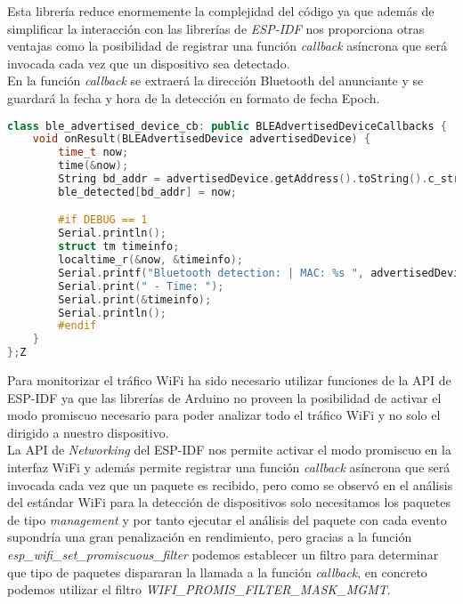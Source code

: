 \documentclass[../proyecto.tex]{subfiles}
\begin{document}
Esta librería reduce enormemente la complejidad del código ya que además de simplificar la interacción con las librerías de \textit{ESP-IDF} nos proporciona otras ventajas como la posibilidad de registrar una función \textit{callback} asíncrona que será invocada cada vez que un dispositivo sea detectado.\\

En la función \textit{callback} se extraerá la dirección Bluetooth del anunciante y se guardará la fecha y hora de la detección en formato de fecha Epoch.\\

\begin{minipage}{\linewidth}
\begin{lstlisting}[language=C++, caption=Función \textit{callback} para el escaneo BLE, captionpos=b, frame=single]
class ble_advertised_device_cb: public BLEAdvertisedDeviceCallbacks {
    void onResult(BLEAdvertisedDevice advertisedDevice) {
        time_t now;
        time(&now);
        String bd_addr = advertisedDevice.getAddress().toString().c_str();
        ble_detected[bd_addr] = now;

        #if DEBUG == 1
        Serial.println();
        struct tm timeinfo;
        localtime_r(&now, &timeinfo);
        Serial.printf("Bluetooth detection: | MAC: %s ", advertisedDevice.getAddress().toString().c_str());
        Serial.print(" - Time: ");
        Serial.print(&timeinfo);
        Serial.println();
        #endif
    }
};Z
\end{lstlisting}
\end{minipage}

Para monitorizar el tráfico WiFi ha sido necesario utilizar funciones de la API de ESP-IDF ya que las librerías de Arduino no proveen la posibilidad de activar el modo promiscuo necesario para poder analizar todo el tráfico WiFi y no solo el dirigido a nuestro dispositivo.\\

La API de \textit{Networking} del ESP-IDF nos permite activar el modo promiscuo en la interfaz WiFi y además permite registrar una función \textit{callback} asíncrona que será invocada cada vez que un paquete es recibido, pero como se observó en el análisis del estándar WiFi para la detección de dispositivos solo necesitamos los paquetes de tipo \textit{management} y por tanto ejecutar el análisis del paquete con cada evento supondría una gran penalización en rendimiento, pero gracias a la función \textit{esp\_wifi\_set\_promiscuous\_filter} podemos establecer un filtro para determinar que tipo de paquetes dispararan la llamada a la función \textit{callback}, en concreto podemos utilizar el filtro \textit{WIFI\_PROMIS\_FILTER\_MASK\_MGMT}.\\
\end{document}

